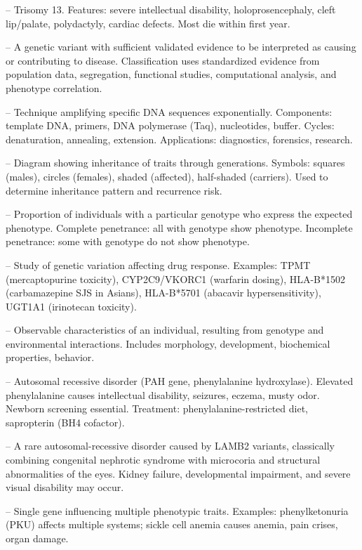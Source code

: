 -- Trisomy 13. Features: severe intellectual disability, holoprosencephaly, cleft lip/palate, polydactyly, cardiac defects. Most die within first year.

-- A genetic variant with sufficient validated evidence to be interpreted as causing or contributing to disease. Classification uses standardized evidence from population data, segregation, functional studies, computational analysis, and phenotype correlation.

-- Technique amplifying specific DNA sequences exponentially. Components: template DNA, primers, DNA polymerase (Taq), nucleotides, buffer. Cycles: denaturation, annealing, extension. Applications: diagnostics, forensics, research.

-- Diagram showing inheritance of traits through generations. Symbols: squares (males), circles (females), shaded (affected), half-shaded (carriers). Used to determine inheritance pattern and recurrence risk.

-- Proportion of individuals with a particular genotype who express the expected phenotype. Complete penetrance: all with genotype show phenotype. Incomplete penetrance: some with genotype do not show phenotype.

-- Study of genetic variation affecting drug response. Examples: TPMT (mercaptopurine toxicity), CYP2C9/VKORC1 (warfarin dosing), HLA-B*1502 (carbamazepine SJS in Asians), HLA-B*5701 (abacavir hypersensitivity), UGT1A1 (irinotecan toxicity).

-- Observable characteristics of an individual, resulting from genotype and environmental interactions. Includes morphology, development, biochemical properties, behavior.

-- Autosomal recessive disorder (PAH gene, phenylalanine hydroxylase). Elevated phenylalanine causes intellectual disability, seizures, eczema, musty odor. Newborn screening essential. Treatment: phenylalanine-restricted diet, sapropterin (BH4 cofactor).

-- A rare autosomal-recessive disorder caused by LAMB2 variants, classically combining congenital nephrotic syndrome with microcoria and structural abnormalities of the eyes. Kidney failure, developmental impairment, and severe visual disability may occur.

-- Single gene influencing multiple phenotypic traits. Examples: phenylketonuria (PKU) affects multiple systems; sickle cell anemia causes anemia, pain crises, organ damage.

